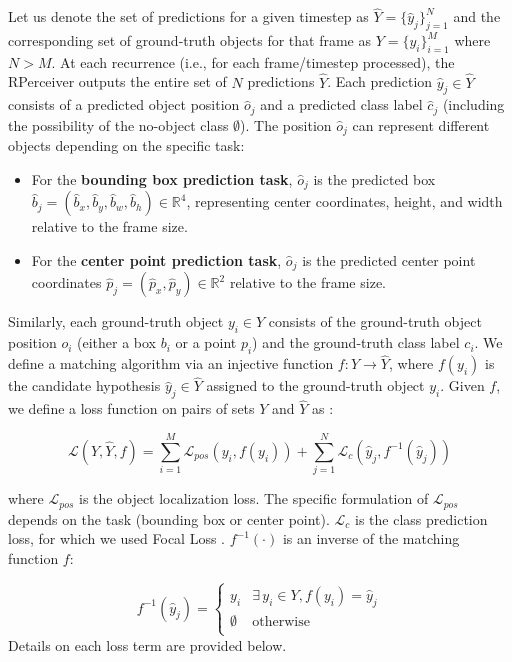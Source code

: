 Let us denote the set of predictions for a given timestep as $ \hat{Y} = \{\hat{y}_j\}_{j=1}^N $ and the corresponding set of ground-truth objects for that frame as $ Y = \{y_i\}_{i=1}^M $ where $ N > M $. At each recurrence (i.e., for each frame/timestep processed), the RPerceiver outputs the entire set of $N$ predictions $\hat{Y}$. Each prediction $\hat{y}_j \in \hat{Y}$ consists of a predicted object position $\hat{o}_j$ and a predicted class label $\hat{c}_j$ (including the possibility of the no-object class $\emptyset$). The position $\hat{o}_j$ can represent different objects depending on the specific task:
\begin{itemize}
    \item For the \textbf{bounding box prediction task}, $\hat{o}_j$ is the predicted box $\hat{b}_j = (\hat{b}_x, \hat{b}_y, \hat{b}_w, \hat{b}_h) \in \mathbb{R}^4$, representing center coordinates, height, and width relative to the frame size.
    \item For the \textbf{center point prediction task}, $\hat{o}_j$ is the predicted center point coordinates $\hat{p}_j = (\hat{p}_x, \hat{p}_y) \in \mathbb{R}^2$ relative to the frame size.
\end{itemize}
Similarly, each ground-truth object $y_i \in Y$ consists of the ground-truth object position $o_i$ (either a box $b_i$ or a point $p_i$) and the ground-truth class label $c_i$.
We define a matching algorithm via an injective function $f: Y \rightarrow \hat{Y}$, where $f(y_i)$ is the candidate hypothesis $\hat{y}_j \in \hat{Y}$ assigned to the ground-truth object $y_i$. Given $f$, we define a loss function on pairs of sets $Y$ and $\hat{Y}$ as \cite{stewartEndtoendPeopleDetection2015}:

\begin{equation} \label{eq:set_loss}
\mathcal{L}(Y, \hat{Y}, f ) = \sum_{i=1}^{M} \mathcal{L}_{pos}(y_i, f(y_i)) +  \sum_{j=1}^{N} \mathcal{L}_c (\hat{y}_j, f^{-1}(\hat{y}_j))
\end{equation}

where $\mathcal{L}_{pos}$ is the object localization loss. The specific formulation of $\mathcal{L}_{pos}$ depends on the task (bounding box or center point). $\mathcal{L}_c$ is the class prediction loss, for which we used Focal Loss \cite{linFocalLossDense2018}. $f^{-1}(\cdot)$ is an inverse of the matching function $f$:

\begin{equation*}
f^{-1}(\hat{y}_j) =
\begin{cases}
y_i & \exists \, y_i \in Y, f(y_i) = \hat{y}_j \\
\emptyset & \text{otherwise} \\
\end{cases}
\end{equation*}
Details on each loss term are provided below.

